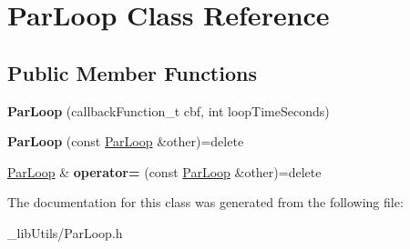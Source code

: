 \hypertarget{class_par_loop}{}\section{Par\+Loop Class Reference}
\label{class_par_loop}
\subsection*{Public Member Functions}
\begin{DoxyCompactItemize}
\item 
{\bfseries Par\+Loop} (callback\+Function\+\_\+t cbf, int loop\+Time\+Seconds)\hypertarget{class_par_loop_a78f2321aed1f6b23a7c1c96c9af657c8}{}\label{class_par_loop_a78f2321aed1f6b23a7c1c96c9af657c8}

\item 
{\bfseries Par\+Loop} (const \hyperlink{class_par_loop}{Par\+Loop} \&other)=delete\hypertarget{class_par_loop_ace74578d6a178d281c088404c3e3c5c3}{}\label{class_par_loop_ace74578d6a178d281c088404c3e3c5c3}

\item 
\hyperlink{class_par_loop}{Par\+Loop} \& {\bfseries operator=} (const \hyperlink{class_par_loop}{Par\+Loop} \&other)=delete\hypertarget{class_par_loop_a08a4587dc3f97fd0bbb6e9d3919565d2}{}\label{class_par_loop_a08a4587dc3f97fd0bbb6e9d3919565d2}

\end{DoxyCompactItemize}


The documentation for this class was generated from the following file\+:\begin{DoxyCompactItemize}
\item 
\+\_\+lib\+Utils/Par\+Loop.\+h\end{DoxyCompactItemize}
